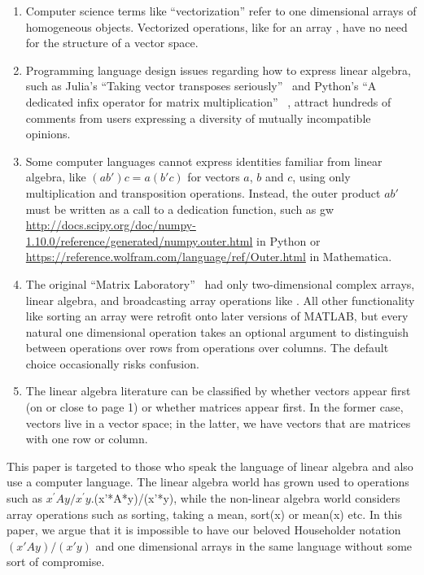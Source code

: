 \begin{enumerate}

\item
Computer science terms like ``vectorization'' refer to one dimensional arrays
of homogeneous objects. Vectorized operations, like  for an array
, have no need for the structure of a vector space.

\item
Programming language design issues regarding how to express linear algebra,
such as Julia's ``Taking vector transposes seriously''~\cite{julia4774} and
Python's ``A dedicated infix operator for matrix multiplication''~
\cite{numpy4351,Smith2014}, attract hundreds of comments from users expressing
a diversity of mutually incompatible opinions.

\item
Some computer languages cannot express identities familiar from linear algebra,
like $(ab')c = a(b'c)$ for vectors $a$, $b$ and $c$, using only multiplication
and transposition operations. Instead, the outer product $ab'$ must be written
as a call to a dedication function, such as gw
\url{http://docs.scipy.org/doc/numpy-1.10.0/reference/generated/numpy.outer.html}
in Python or
\url{https://reference.wolfram.com/language/ref/Outer.html}
in Mathematica.

\item The original ``Matrix Laboratory''~\cite{Moler1980} had only
two-dimensional complex arrays, linear algebra, and broadcasting array
operations like . All other functionality like sorting an array
were retrofit onto later versions of MATLAB, but every natural one dimensional
operation takes an optional  argument to distinguish between
operations over rows from operations over columns. The default 
choice occasionally risks confusion.

\item The linear algebra literature can be classified by whether vectors
appear first (on or close to page 1) or whether matrices appear first.
In the former case, vectors live in a vector space; in the latter,
we have vectors that are matrices with one row or column.

\end{enumerate}


This paper is targeted to those who speak the language of linear algebra and
also use a computer language. The linear algebra world has grown used to
operations such as $x^\prime Ay/x^\prime y$.(x’*A*y)/(x’*y), while the
non-linear algebra world considers array operations such as sorting, taking a
mean, sort(x) or mean(x) etc. In this paper, we argue that it is impossible to
have our beloved Householder notation $(x'Ay)/(x'y)$ and one dimensional arrays
in the same language without some sort of compromise.


